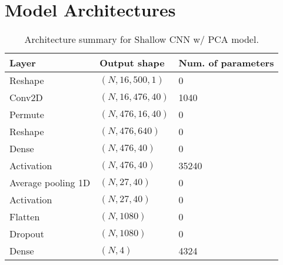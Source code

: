 \documentclass{article}
\begin{document}

\section{Model Architectures}
\begin{table}[H]
\small
\begin{center}
    \begin{tabular}{|l|l|l|}
        \hline
        Layer   & Output shape  & Num. of parameters \\
        \hline\hline
        Reshape             & $(N, 16, 500, 1)$     & 0     \\
        Conv2D              & $(N, 16, 476, 40)$    & 1040  \\
        Permute             & $(N, 476, 16, 40)$    & 0     \\
        Reshape             & $(N, 476, 640)$       & 0     \\
        Dense               & $(N, 476, 40)$        & 0     \\
        Activation          & $(N, 476, 40)$        & 35240 \\
        Average pooling 1D  & $(N, 27, 40)$         & 0     \\
        Activation          & $(N, 27, 40)$         & 0     \\
        Flatten             & $(N, 1080)$           & 0     \\
        Dropout             & $(N, 1080)$           & 0     \\
        Dense               & $(N, 4)$              & 4324  \\
        \hline
    \end{tabular}
\end{center}
\caption{Architecture summary for Shallow CNN w/ PCA model.}
\label{tab:shallow}
\end{table}
\end{document}
